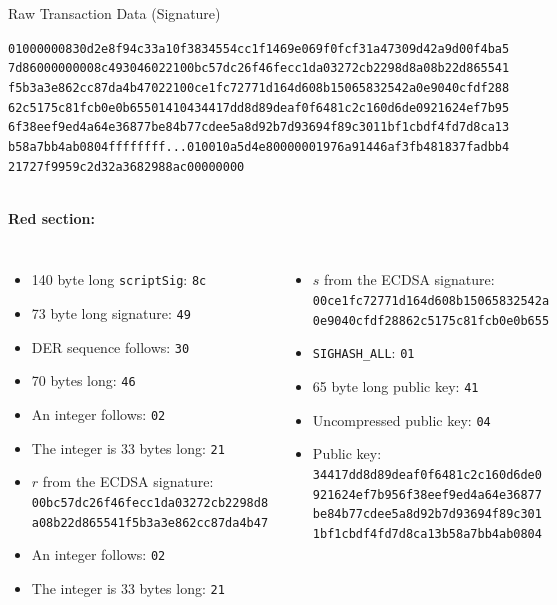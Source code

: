 \documentclass[]{beamer}
\begin{document}
\begin{frame}{Raw Transaction Data (Signature)}
\begin{scriptsize}
\texttt{\textcolor{black!50}{01000000830d2e8f94c33a10f3834554cc1f1469e069f0fcf31a47309d42a9d00f4ba5
7d8600000000}{\alert<1>{8c}\alert<2>{49}\alert<3>{30}\alert<4>{46}\alert<5>{02}\alert<6>{21}\alert<7>{00bc57dc26f46fecc1da03272cb2298d8a08b22d865541
f5b3a3e862cc87da4b47}\alert<8>{02}\alert<9>{21}\alert<10>{00ce1fc72771d164d608b15065832542a0e9040cfdf288
62c5175c81fcb0e0b655}\alert<11>{01}\alert<12>{41}\alert<13>{04}\alert<14>{34417dd8d89deaf0f6481c2c160d6de0921624ef7b95
6f38eef9ed4a64e36877be84b77cdee5a8d92b7d93694f89c3011bf1cbdf4fd7d8ca13
b58a7bb4ab0804}}\textcolor{black!50}{ffffffff...010010a5d4e80000001976a91446af3fb481837fadbb4
21727f9959c2d32a3682988ac00000000}}
\end{scriptsize}
\vspace{1em}
\scriptsize \\
\textbf{Red section:}\\
\begin{columns}[T]
\begin{itemize}
	\item \alert<1>{140 byte long \texttt{scriptSig}: \texttt{8c}}
	\item \alert<2>{73 byte long signature: \texttt{49}}
	\item \alert<3>{DER sequence follows: \texttt{30}}
	\item \alert<4>{70 bytes long: \texttt{46}}
	\item \alert<5>{An integer follows: \texttt{02}}
	\item \alert<6>{The integer is 33 bytes long: \texttt{21}}
	\item \alert<7>{$r$ from the ECDSA signature: 	\texttt{00bc57dc26f46fecc1da03272cb2298d8\\
	a08b22d865541f5b3a3e862cc87da4b47}}
	\item \alert<8>{An integer follows: \texttt{02}}
	\item \alert<9>{The integer is 33 bytes long: \texttt{21}}
\end{itemize}
\begin{itemize}
	\item \alert<10>{$s$ from the ECDSA signature: \texttt{00ce1fc72771d164d608b15065832542a\\
	0e9040cfdf28862c5175c81fcb0e0b655}}
	\item \alert<11>{\texttt{SIGHASH\_ALL}: \texttt{01}}
	\item \alert<12>{65 byte long public key: \texttt{41}}
	\item \alert<13>{Uncompressed public key: \texttt{04}}
	\item \alert<14>{Public key: \texttt{34417dd8d89deaf0f6481c2c160d6de0\\
	921624ef7b956f38eef9ed4a64e36877\\
	be84b77cdee5a8d92b7d93694f89c301\\
	1bf1cbdf4fd7d8ca13b58a7bb4ab0804}}
\end{itemize}
\end{columns}
\end{frame}
\end{document}
